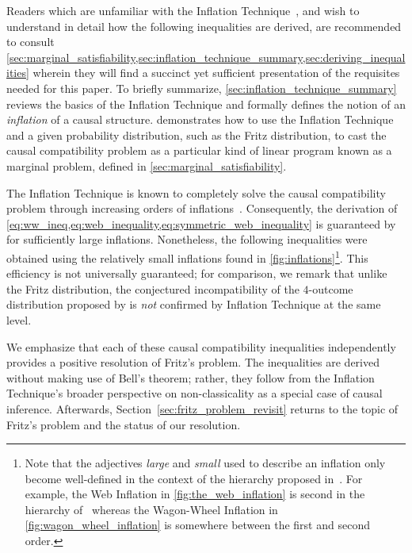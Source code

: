 \documentclass[aps, 10pt, english, twoside, pra, nofootinbib, tightenlines, longbibliography, superscriptaddress]{revtex4-1}
\begin{document}
    Readers which are unfamiliar with the Inflation Technique~\cite{Inflation}, and wish to understand in detail how the following inequalities are derived, are recommended to consult \cref{sec:marginal_satisfiability,sec:inflation_technique_summary,sec:deriving_inequalities} wherein they will find a succinct yet sufficient presentation of the requisites needed for this paper. To briefly summarize, \cref{sec:inflation_technique_summary} reviews the basics of the Inflation Technique and formally defines the notion of an \textit{inflation} of a causal structure.  demonstrates how to use the Inflation Technique and a given probability distribution, such as the Fritz distribution, to cast the causal compatibility problem as a particular kind of linear program known as a marginal problem, defined in \cref{sec:marginal_satisfiability}.

    The Inflation Technique is known to completely solve the causal compatibility problem through increasing orders of inflations~\cite{Navascues_2017}. Consequently, the derivation of \cref{eq:ww_ineq,eq:web_inequality,eq:symmetric_web_inequality} is guaranteed by~\cite{Navascues_2017} for sufficiently large inflations. Nonetheless, the following inequalities were obtained using the relatively small inflations found in \cref{fig:inflations}\footnote{Note that the adjectives \textit{large} and \textit{small} used to describe an inflation only become well-defined in the context of the hierarchy proposed in~\cite{Navascues_2017}. For example, the Web Inflation in \cref{fig:the_web_inflation} is second in the hierarchy of~\cite{Navascues_2017} whereas the Wagon-Wheel Inflation in \cref{fig:wagon_wheel_inflation} is somewhere between the first and second order.}. This efficiency is not universally guaranteed; for comparison, we remark that unlike the Fritz distribution, the conjectured incompatibility of the $4$-outcome distribution proposed by \cite{Gisin_2017} is \textit{not} confirmed by Inflation Technique at the same level.

    We emphasize that each of these causal compatibility inequalities independently provides a positive resolution of Fritz's problem. The inequalities are derived without making use of Bell's theorem; rather, they follow from the Inflation Technique's broader perspective on non-classicality as a special case of causal inference. Afterwards, Section~\ref{sec:fritz_problem_revisit} returns to the topic of Fritz's problem and the status of our resolution.
\end{document}
